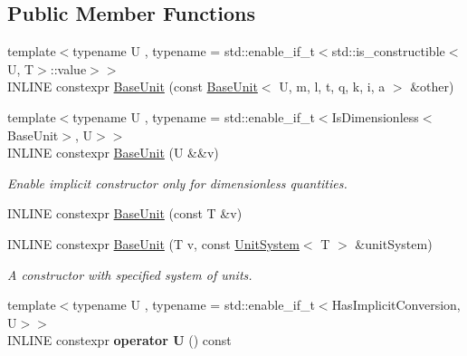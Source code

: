 \subsection*{Public Member Functions}
\begin{DoxyCompactItemize}
\item 
{\footnotesize template$<$typename U , typename  = std\+::enable\+\_\+if\+\_\+t$<$std\+::is\+\_\+constructible$<$\+U, T$>$\+::value$>$$>$ }\\I\+N\+L\+I\+NE constexpr \hyperlink{classBaseUnit_aed70e2462e9f56a37b56ffa3bae498dd}{Base\+Unit} (const \hyperlink{classBaseUnit}{Base\+Unit}$<$ U, m, l, t, q, k, i, a $>$ \&other)
\item 
\hypertarget{classBaseUnit_a54be10a39c088f37ee5e6bac2e7e8a3d}{}\label{classBaseUnit_a54be10a39c088f37ee5e6bac2e7e8a3d} 
{\footnotesize template$<$typename U , typename  = std\+::enable\+\_\+if\+\_\+t$<$\+Is\+Dimensionless$<$\+Base\+Unit$>$, U$>$$>$ }\\I\+N\+L\+I\+NE constexpr \hyperlink{classBaseUnit_a54be10a39c088f37ee5e6bac2e7e8a3d}{Base\+Unit} (U \&\&v)
\begin{DoxyCompactList}\small\item\em Enable implicit constructor only for dimensionless quantities. \end{DoxyCompactList}\item 
I\+N\+L\+I\+NE constexpr \hyperlink{classBaseUnit_a654e7723f3738c286b84d6b5d4d718d5}{Base\+Unit} (const T \&v)
\item 
\hypertarget{classBaseUnit_aeaef4d98ce415a1e23c03f4967484640}{}\label{classBaseUnit_aeaef4d98ce415a1e23c03f4967484640} 
I\+N\+L\+I\+NE constexpr \hyperlink{classBaseUnit_aeaef4d98ce415a1e23c03f4967484640}{Base\+Unit} (T v, const \hyperlink{classUnitSystem}{Unit\+System}$<$ T $>$ \&unit\+System)
\begin{DoxyCompactList}\small\item\em A constructor with specified system of units. \end{DoxyCompactList}\item 
\hypertarget{classBaseUnit_a390a012813cfbb1ef6c32d6663dee6ef}{}\label{classBaseUnit_a390a012813cfbb1ef6c32d6663dee6ef} 
{\footnotesize template$<$typename U , typename  = std\+::enable\+\_\+if\+\_\+t$<$\+Has\+Implicit\+Conversion, U$>$$>$ }\\I\+N\+L\+I\+NE constexpr {\bfseries operator U} () const
\item 
\hypertarget{classBaseUnit_a5cf1571b1bb667033c7b6bf3709cd97a}{}\label{classBaseUnit_a5cf1571b1bb667033c7b6bf3709cd97a} 

\end{DoxyCompactItemize}
